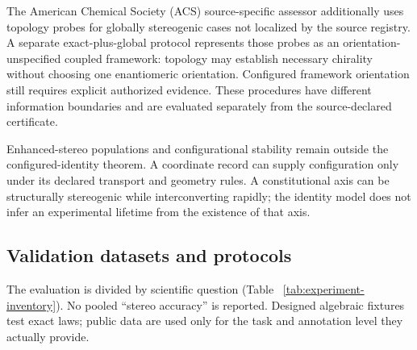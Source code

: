 \documentclass[pdflatex,sn-mathphys-num,referee,lineno]{sn-jnl}
\theoremstyle{plain}
\theoremstyle{remark}
\theoremstyle{definition}
\begin{document}
The American Chemical Society (ACS) source-specific assessor additionally uses topology probes for globally
stereogenic cases not localized by the source registry. A separate
exact-plus-global protocol represents those probes as an orientation-unspecified
coupled framework: topology may establish necessary chirality without choosing
one enantiomeric orientation. Configured framework orientation still requires
explicit authorized evidence. These procedures have different information
boundaries and are evaluated separately from the source-declared certificate.

Enhanced-stereo populations and configurational stability remain outside the
configured-identity theorem. A coordinate record can supply configuration only
under its declared transport and geometry rules. A constitutional axis can be
structurally stereogenic while interconverting rapidly; the identity model does
not infer an experimental lifetime from the existence of that axis.

\label{sec:results}

\subsection{Validation datasets and protocols}
\label{sec:experiment-list}

The evaluation is divided by scientific question (Table~
\ref{tab:experiment-inventory}).  No pooled ``stereo accuracy'' is reported.
Designed algebraic fixtures test exact laws; public data are used only for the
task and annotation level they actually provide.
\end{document}
